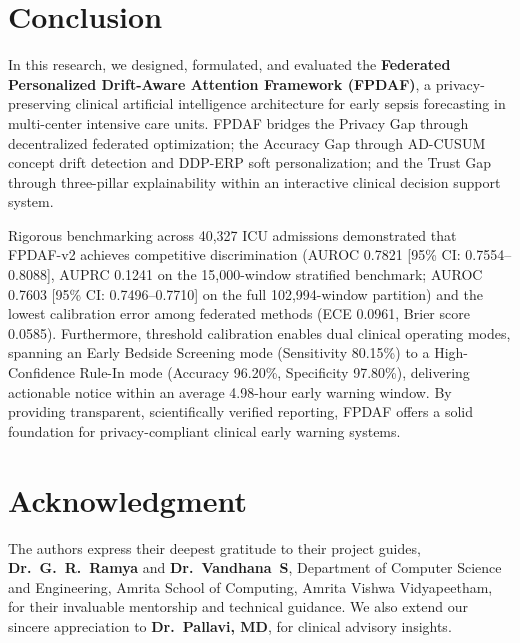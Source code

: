 \documentclass[journal,twocolumn,10pt]{IEEEtran}
\begin{document}
\section{Conclusion}
In this research, we designed, formulated, and evaluated the \textbf{Federated Personalized Drift-Aware Attention Framework (FPDAF)}, a privacy-preserving clinical artificial intelligence architecture for early sepsis forecasting in multi-center intensive care units. FPDAF bridges the Privacy Gap through decentralized federated optimization; the Accuracy Gap through AD-CUSUM concept drift detection and DDP-ERP soft personalization; and the Trust Gap through three-pillar explainability within an interactive clinical decision support system.

Rigorous benchmarking across 40,327 ICU admissions demonstrated that FPDAF-v2 achieves competitive discrimination (AUROC 0.7821 [95\% CI: 0.7554--0.8088], AUPRC 0.1241 on the 15,000-window stratified benchmark; AUROC 0.7603 [95\% CI: 0.7496--0.7710] on the full 102,994-window partition) and the lowest calibration error among federated methods (ECE 0.0961, Brier score 0.0585). Furthermore, threshold calibration enables dual clinical operating modes, spanning an Early Bedside Screening mode (Sensitivity 80.15\%) to a High-Confidence Rule-In mode (Accuracy 96.20\%, Specificity 97.80\%), delivering actionable notice within an average 4.98-hour early warning window. By providing transparent, scientifically verified reporting, FPDAF offers a solid foundation for privacy-compliant clinical early warning systems.

\section*{Acknowledgment}
The authors express their deepest gratitude to their project guides, \textbf{Dr.~G.~R.~Ramya} and \textbf{Dr.~Vandhana~S}, Department of Computer Science and Engineering, Amrita School of Computing, Amrita Vishwa Vidyapeetham, for their invaluable mentorship and technical guidance. We also extend our sincere appreciation to \textbf{Dr.~Pallavi, MD}, for clinical advisory insights.

\balance


\end{document}
